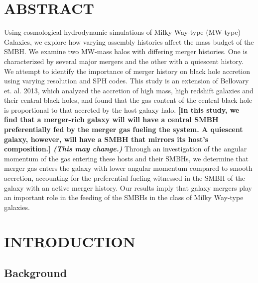 \documentclass[12pt,headA,chapB]{fiskthesis}
\begin{document}


\newpage
{}
\listoffigures
\thispagestyle{fancy}


\newpage
{}
\chapter*{\normalsize ABSTRACT}
\thispagestyle{empty}
\rhead{\small\thepage}
Using cosmological hydrodynamic simulations of Milky Way-type (MW-type) Galaxies, we explore how varying assembly histories affect the mass budget of the SMBH. We examine two MW-mass halos with differing merger histories. One is characterized by several major mergers and the other with a quiescent history. We attempt to identify the importance of merger history on black hole accretion using varying resolution and SPH codes. This study is an extension of Bellovary et. al. 2013, which analyzed the accretion of high mass, high redshift galaxies and their central black holes, and found that the gas content of the central black hole is proportional to that accreted by the host galaxy halo. \textbf{[In this study, we find that a merger-rich galaxy will will have a central SMBH preferentially fed by the merger gas fueling the system. A quiescent galaxy, however, will have a SMBH that mirrors its host's composition.] \textit{(This may change.)}} Through an investigation of the angular momentum of the gas entering these hosts and their SMBHs, we determine that merger gas enters the galaxy with lower angular momentum compared to smooth accretion, accounting for the preferential fueling witnessed in the SMBH of the galaxy with an active merger history. Our results imply that galaxy mergers play an important role in the feeding of the SMBHs in the class of Milky Way-type galaxies.
\vspace{4ex}


\mainmatter
\chapter{\normalsize INTRODUCTION}
\section{\normalsize Background}
\thispagestyle{empty}
\end{document}
